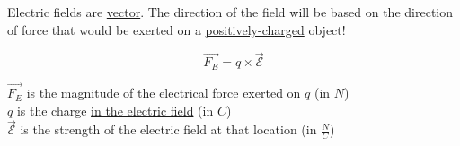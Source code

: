 \noindent\hrulefill
\begin{remark}
    Electric fields are \underline{vector}. The direction of the field will be based on the direction of force that would be 
    exerted on a \underline{positively-charged} object!
\end{remark}
\noindent\hrulefill

\begin{equation}
    \vec{F_E} = q \times \vec{\mathcal{E}}
\end{equation}

\begin{center}
    $\vec{F_E}$ is the magnitude of the electrical force exerted on $q$ (in $N$)\\
    $q$ is the charge \underline{in the electric field} (in $C$)\\
    $\vec{\mathcal{E}}$ is the strength of the electric field at that location (in $\frac{N}{C}$)
\end{center}
